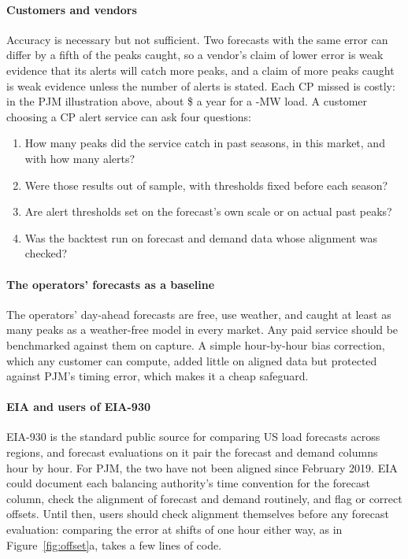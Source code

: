 \documentclass[preprint,12pt,authoryear]{elsarticle}
\begin{document}
\paragraph{Customers and vendors} Accuracy is necessary but not sufficient. Two forecasts with the same error can differ by a fifth of the peaks caught, so a vendor's claim of lower error is weak evidence that its alerts will catch more peaks, and a claim of more peaks caught is weak evidence unless the number of alerts is stated. Each CP missed is costly: in the PJM illustration above, about \$ a year for a -MW load. A customer choosing a CP alert service can ask four questions:
\begin{enumerate}
\item How many peaks did the service catch in past seasons, in this market, and with how many alerts?
\item Were those results out of sample, with thresholds fixed before each season?
\item Are alert thresholds set on the forecast's own scale or on actual past peaks?
\item Was the backtest run on forecast and demand data whose alignment was checked?
\end{enumerate}

\paragraph{The operators' forecasts as a baseline} The operators' day-ahead forecasts are free, use weather, and caught at least as many peaks as a weather-free model in every market. Any paid service should be benchmarked against them on capture. A simple hour-by-hour bias correction, which any customer can compute, added little on aligned data but protected against PJM's timing error, which makes it a cheap safeguard.

\paragraph{EIA and users of EIA-930} EIA-930 is the standard public source for comparing US load forecasts across regions, and forecast evaluations on it pair the forecast and demand columns hour by hour. For PJM, the two have not been aligned since February 2019. EIA could document each balancing authority's time convention for the forecast column, check the alignment of forecast and demand routinely, and flag or correct offsets. Until then, users should check alignment themselves before any forecast evaluation: comparing the error at shifts of one hour either way, as in Figure~\ref{fig:offset}a, takes a few lines of code.
\end{document}
